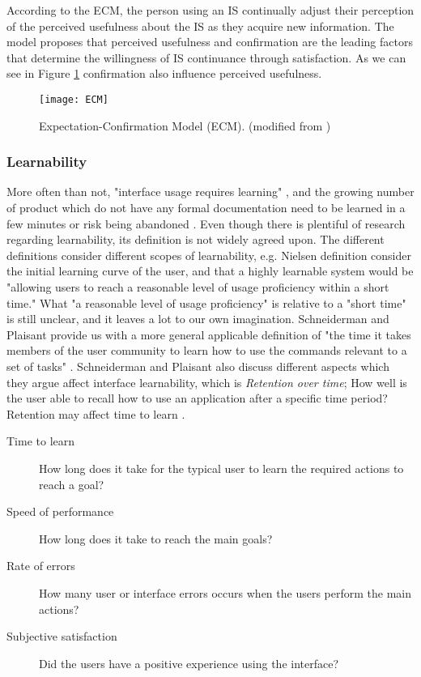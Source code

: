 According to the ECM, the person using an IS continually adjust their perception of the perceived usefulness about the IS as they acquire new information. The model proposes that perceived usefulness and confirmation are the leading factors that determine the willingness of IS continuance through satisfaction. As we can see in Figure \ref{fig:ECM} confirmation also influence perceived usefulness.

\begin{figure}[h]
  \centering
    \texttt{[image: ECM]}
  \caption{Expectation-Confirmation Model (ECM). (modified from \cite{Bhattacherjee2001a})}
  \label{fig:ECM}
\end{figure}

\subsubsection{Learnability}
More often than not, "interface usage requires learning" \cite{Grossman2009}, and the growing number of product which do not have any formal documentation need to be learned in a few minutes or risk being abandoned \cite{Bergman2000}. Even though there is plentiful of research regarding learnability, its definition is not widely agreed upon. The different definitions consider different scopes of learnability, e.g. Nielsen definition consider the initial learning curve of the user, and that a highly learnable system would be "allowing users to reach a reasonable level of usage proficiency within a short time." What "a reasonable level of usage proficiency" is relative to a "short time" is still unclear, and it leaves a lot to our own imagination. Schneiderman and Plaisant provide us with a more general applicable definition of "the time it takes members of the user community to learn how to use the commands relevant to a set of tasks" \cite{Shneiderman2004}. Schneiderman and Plaisant also discuss different aspects which they argue affect interface learnability, which is \textit{Retention over time}; How well is the user able to recall how to use an application after a specific time period? Retention may affect time to learn \cite{Shneiderman2004}.

\begin{description}
  \item[Time to learn] How long does it take for the typical user to learn the required actions to reach a goal?
  \item[Speed of performance] How long does it take to reach the main goals?
  \item[Rate of errors] How many user or interface errors occurs when the users perform the main actions?
  \item[Subjective satisfaction] Did the users have a positive experience using the interface?
\end{description}

